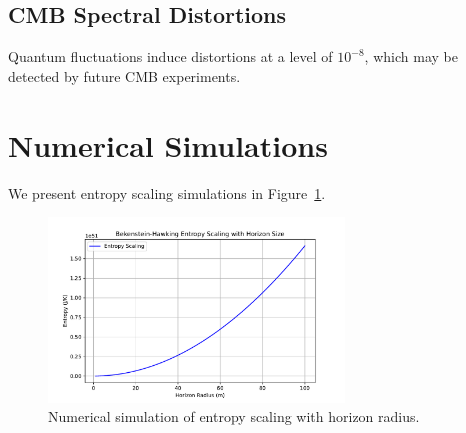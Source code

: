 \documentclass[12pt, a4paper]{article}
\begin{document}
\subsection{CMB Spectral Distortions}
Quantum fluctuations induce distortions at a level of $10^{-8}$, which may be detected by future CMB experiments.

\section{Numerical Simulations}
We present entropy scaling simulations in Figure~\ref{fig:entropy_plot}.

\begin{figure}[H]
    \centering
    \includegraphics[width=0.7\textwidth]{entropy_plot.pdf}
    \caption{Numerical simulation of entropy scaling with horizon radius.}
    \label{fig:entropy_plot}
\end{figure}



\end{document}
